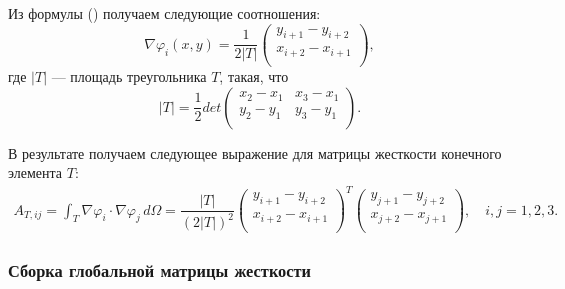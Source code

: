 \documentclass[12pt, a4paper]{article}
\renewcommand{\phi}{\varphi}
\begin{document}
				Из формулы () получаем следующие соотношения:
				\begin{equation*}
					\nabla \phi_{i}(x,y) = \dfrac{1}{2 |T|} 
					\begin{pmatrix}
						y_{i+1} - y_{i+2} \\
						x_{i+2} - x_{i+1} \\
					\end{pmatrix},
				\end{equation*}
				где $|T|$ --- площадь треугольника $T$, такая, что
				\begin{equation*}
					|T| = \dfrac{1}{2} 
					det{
						\begin{pmatrix}
							x_2 - x_1 & x_3 - x_1 \\
							y_2 - y_1 & y_3 - y_1 \\
						\end{pmatrix}				
					}.
				\end{equation*}
				
				В результате получаем следующее выражение для матрицы жесткости конечного элемента $T$:
				\begin{eqnarray}
					A_{T,ij} = \int_{T} \nabla \phi_i \cdot \nabla \phi_j \, d\Omega
					= \dfrac{|T|}{(2|T|)^2} 
					\begin{pmatrix}
						y_{i+1} - y_{i+2}\\
						x_{i+2} - x_{i+1}\\
					\end{pmatrix}^T
					\begin{pmatrix}
						y_{j+1} - y_{j+2}\\
						x_{j+2} - x_{j+1}\\
					\end{pmatrix},
					\quad i,j=1,2,3.
					\label{A_stiff_in_T}
				\end{eqnarray}
				
			\subsubsection{Сборка глобальной матрицы жесткости}
				
\end{document}
